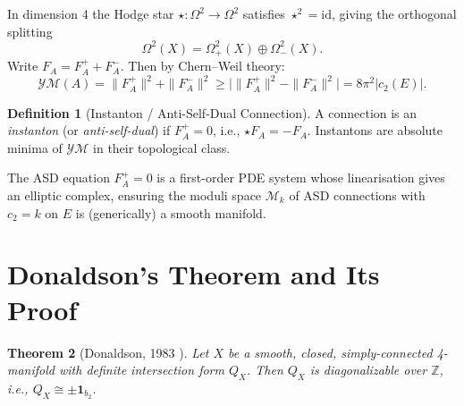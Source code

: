 \documentclass[12pt,a4paper]{amsart}
\newtheorem{theorem}{Theorem}[section]
\theoremstyle{definition}
\newtheorem{definition}[theorem]{Definition}
\theoremstyle{remark}
\newcommand{\ZZ}{\mathbb{Z}}
\begin{document}
In dimension 4 the Hodge star $\star \colon \Omega^2 \to \Omega^2$ satisfies
$\star^2 = \mathrm{id}$, giving the orthogonal splitting
\[
  \Omega^2(X) = \Omega^2_+(X) \oplus \Omega^2_-(X).
\]
Write $F_A = F_A^+ + F_A^-$.  Then by Chern--Weil theory:
\[
  \mathcal{YM}(A) = \|F_A^+\|^2 + \|F_A^-\|^2
  \ge \bigl|\|F_A^+\|^2 - \|F_A^-\|^2\bigr| = 8\pi^2 |c_2(E)|.
\]

\begin{definition}[Instanton / Anti-Self-Dual Connection]
A connection is an \emph{instanton} (or \emph{anti-self-dual}) if
$F_A^+ = 0$, i.e., $\star F_A = -F_A$.  Instantons are absolute minima
of $\mathcal{YM}$ in their topological class.
\end{definition}

The ASD equation $F_A^+ = 0$ is a first-order PDE system whose linearisation
gives an elliptic complex, ensuring the moduli space $\mathcal{M}_k$ of ASD
connections with $c_2 = k$ on $E$ is (generically) a smooth manifold.

\section{Donaldson's Theorem and Its Proof}

\begin{theorem}[Donaldson, 1983 \cite{Donaldson1983}]
Let $X$ be a smooth, closed, simply-connected 4-manifold with definite
intersection form $Q_X$.  Then $Q_X$ is diagonalizable over $\ZZ$, i.e.,
$Q_X \cong \pm \mathbf{1}_{b_2}$.
\end{theorem}
\end{document}
